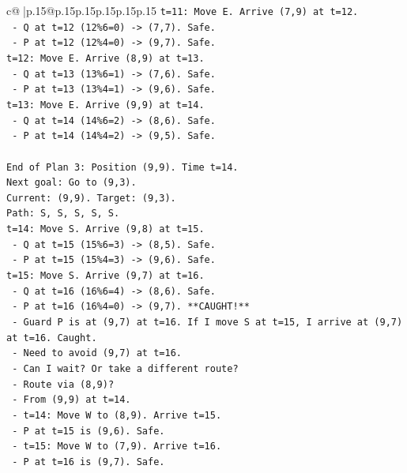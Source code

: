 \documentclass{article}
\begin{document}
{\begin{supertabular}{c@{$\;$}|p{.15\linewidth}@{}p{.15\linewidth}p{.15\linewidth}p{.15\linewidth}p{.15\linewidth}p{.15\linewidth}}
{{{\texttt{t=11: Move E. Arrive (7,9) at t=12.} \\
\texttt{  {-} Q at t=12 (12\%6=0) {-}> (7,7). Safe.} \\
\texttt{  {-} P at t=12 (12\%4=0) {-}> (9,7). Safe.} \\
\texttt{t=12: Move E. Arrive (8,9) at t=13.} \\
\texttt{  {-} Q at t=13 (13\%6=1) {-}> (7,6). Safe.} \\
\texttt{  {-} P at t=13 (13\%4=1) {-}> (9,6). Safe.} \\
\texttt{t=13: Move E. Arrive (9,9) at t=14.} \\
\texttt{  {-} Q at t=14 (14\%6=2) {-}> (8,6). Safe.} \\
\texttt{  {-} P at t=14 (14\%4=2) {-}> (9,5). Safe.} \\
\\ 
\texttt{End of Plan 3: Position (9,9). Time t=14.} \\
\texttt{Next goal: Go to (9,3).} \\
\texttt{Current: (9,9). Target: (9,3).} \\
\texttt{Path: S, S, S, S, S.} \\
\texttt{t=14: Move S. Arrive (9,8) at t=15.} \\
\texttt{  {-} Q at t=15 (15\%6=3) {-}> (8,5). Safe.} \\
\texttt{  {-} P at t=15 (15\%4=3) {-}> (9,6). Safe.} \\
\texttt{t=15: Move S. Arrive (9,7) at t=16.} \\
\texttt{  {-} Q at t=16 (16\%6=4) {-}> (8,6). Safe.} \\
\texttt{  {-} P at t=16 (16\%4=0) {-}> (9,7). **CAUGHT!**} \\
\texttt{  {-} Guard P is at (9,7) at t=16. If I move S at t=15, I arrive at (9,7) at t=16. Caught.} \\
\texttt{  {-} Need to avoid (9,7) at t=16.} \\
\texttt{  {-} Can I wait? Or take a different route?} \\
\texttt{  {-} Route via (8,9)?} \\
\texttt{  {-} From (9,9) at t=14.} \\
\texttt{  {-} t=14: Move W to (8,9). Arrive t=15.} \\
\texttt{    {-} P at t=15 is (9,6). Safe.} \\
\texttt{  {-} t=15: Move W to (7,9). Arrive t=16.} \\
\texttt{    {-} P at t=16 is (9,7). Safe.} \\
}}}
\end{supertabular}}
\end{document}
